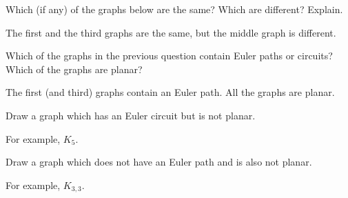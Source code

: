 \begin{questions}


\question Which (if any) of the graphs below are the same?  Which are different?  Explain.

\begin{center}
  \hfill
  \hfill
\end{center}

	\begin{answer}
		The first and the third graphs are the same, but the middle graph is different.
	\end{answer}





\question Which of the graphs in the previous question contain Euler paths or circuits?  Which of the graphs are planar?

	\begin{answer}
		The first (and third) graphs contain an Euler path.  All the graphs are planar.
	\end{answer}






\question Draw a graph which has an Euler circuit but is not planar.

	\begin{answer}
		For example, $K_5$.
	\end{answer}





\question Draw a graph which does not have an Euler path and is also not planar.

	\begin{answer}
		For example, $K_{3,3}$.
	\end{answer}






\end{questions}
